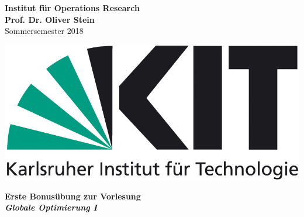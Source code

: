 \documentclass[ngerman, a4paper,12pt]{article}
\begin{document}
\begin{flushleft}
\vspace*{-100pt}
\textbf{Institut f\"ur Operations Research \\
Prof. Dr. Oliver Stein \\}
Sommersemester 2018
\vspace*{15pt}
\end{flushleft}

\begin{flushright}
\vspace*{-80pt}
\includegraphics[scale=0.5]{kit_logo}
\vspace*{15pt}
\end{flushright}

\begin{center}
\textbf{Erste Bonusübung zur Vorlesung \\
\emph{Globale Optimierung I}}        
\end{center}
\end{document}
